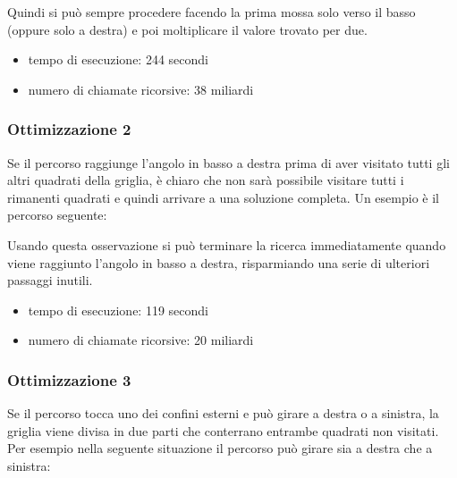 Quindi si può sempre procedere facendo la prima mossa solo verso il basso
(oppure solo a destra) e poi moltiplicare il valore trovato per due.


\begin{itemize}
\item
tempo di esecuzione: 244 secondi
\item
numero di chiamate ricorsive: 38 miliardi
\end{itemize}

\subsubsection{Ottimizzazione 2}

Se il percorso raggiunge l'angolo in basso a destra
prima di aver visitato tutti gli altri quadrati della griglia,
è chiaro che non sarà possibile visitare tutti i rimanenti
quadrati e quindi arrivare a una soluzione completa.
Un esempio è il percorso seguente:

\begin{center}
\end{center}
Usando questa osservazione si può terminare la ricerca immediatamente 
quando viene raggiunto l'angolo in basso a destra, risparmiando una 
serie di ulteriori passaggi inutili.

\begin{itemize}
\item
tempo di esecuzione: 119 secondi
\item
numero di chiamate ricorsive: 20 miliardi
\end{itemize}

\subsubsection{Ottimizzazione 3}

Se il percorso tocca uno dei confini esterni e 
può girare a destra o a sinistra, la griglia viene divisa in due parti
che conterrano entrambe quadrati non visitati.
Per esempio nella seguente situazione il percorso può girare sia
a destra che a sinistra:

